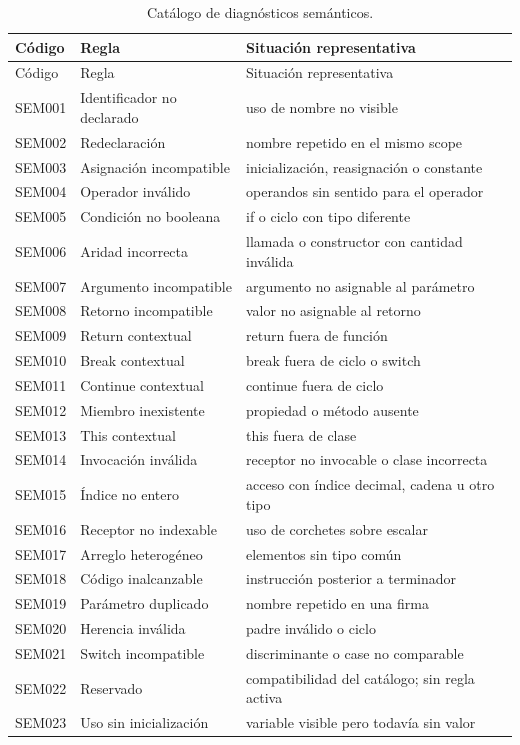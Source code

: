 \documentclass[11pt,letterpaper,oneside]{report}
\begin{document}
\begin{longtable}{>{\ttfamily}p{1.6cm}p{4.2cm}p{7.5cm}}
\caption{Catálogo de diagnósticos semánticos.}\label{tab:diagnostics}\\
\toprule
\normalfont Código & Regla & Situación representativa \\
\midrule
\endfirsthead
\toprule
\normalfont Código & Regla & Situación representativa \\
\midrule
\endhead
SEM001 & Identificador no declarado & uso de nombre no visible \\
SEM002 & Redeclaración & nombre repetido en el mismo scope \\
SEM003 & Asignación incompatible & inicialización, reasignación o constante \\
SEM004 & Operador inválido & operandos sin sentido para el operador \\
SEM005 & Condición no booleana & if o ciclo con tipo diferente \\
SEM006 & Aridad incorrecta & llamada o constructor con cantidad inválida \\
SEM007 & Argumento incompatible & argumento no asignable al parámetro \\
SEM008 & Retorno incompatible & valor no asignable al retorno \\
SEM009 & Return contextual & return fuera de función \\
SEM010 & Break contextual & break fuera de ciclo o switch \\
SEM011 & Continue contextual & continue fuera de ciclo \\
SEM012 & Miembro inexistente & propiedad o método ausente \\
SEM013 & This contextual & this fuera de clase \\
SEM014 & Invocación inválida & receptor no invocable o clase incorrecta \\
SEM015 & Índice no entero & acceso con índice decimal, cadena u otro tipo \\
SEM016 & Receptor no indexable & uso de corchetes sobre escalar \\
SEM017 & Arreglo heterogéneo & elementos sin tipo común \\
SEM018 & Código inalcanzable & instrucción posterior a terminador \\
SEM019 & Parámetro duplicado & nombre repetido en una firma \\
SEM020 & Herencia inválida & padre inválido o ciclo \\
SEM021 & Switch incompatible & discriminante o case no comparable \\
SEM022 & Reservado & compatibilidad del catálogo; sin regla activa \\
SEM023 & Uso sin inicialización & variable visible pero todavía sin valor \\
\bottomrule
\end{longtable}
\end{document}
